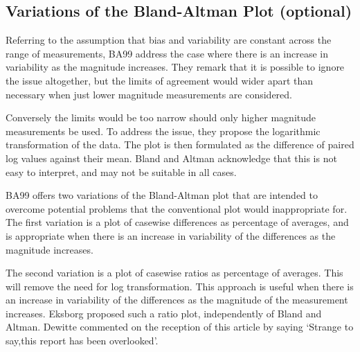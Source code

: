 \documentclass[compress]{beamer}        %
\begin{document}

\subsection{Variations of the Bland-Altman Plot (optional)}
\begin{frame}
Referring to the
assumption that bias and variability are constant across the range
of measurements, \alert{BA99} address the case where there is an
increase in variability as the magnitude increases. They remark
that it is possible to ignore the issue altogether, but the limits
of agreement would wider apart than necessary when just lower
magnitude measurements are considered. 
\end{frame}

\begin{frame}
Conversely the limits would
be too narrow should only higher magnitude measurements be used.
To address the issue, they propose the logarithmic transformation
of the data. The plot is then formulated as the difference of
paired log values against their mean. Bland and Altman acknowledge
that this is not easy to interpret, and may not be suitable in
all cases.
\end{frame}
\begin{frame}

\alert{BA99} offers two variations of the Bland-Altman plot that
are intended to overcome potential problems that the conventional
plot would inappropriate for. The first variation is a plot of
casewise differences as percentage of averages, and is appropriate
when there is an increase in variability of the differences as the
magnitude increases. 
\end{frame}
\begin{frame}
The second variation is a plot of casewise
ratios as percentage of averages. This will remove the need for
log transformation. This approach is useful when there is an
increase in variability of the differences as the magnitude of the
measurement increases. \alert{Eksborg} proposed such a ratio plot,
independently of Bland and Altman. \alert{Dewitte} commented on
the reception of this article by saying `Strange to say,this
report has been overlooked'.

\end{frame}
\end{document}
